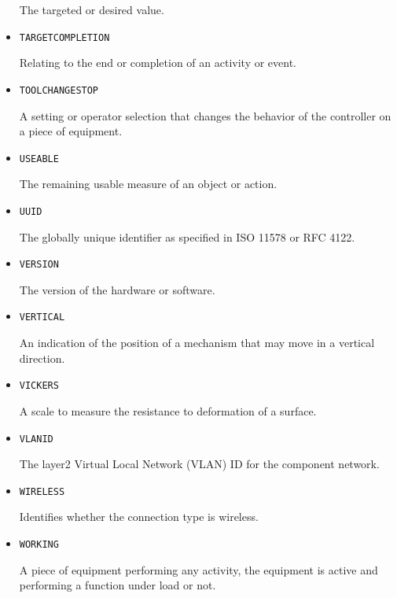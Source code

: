 \begin{itemize}
The targeted or desired value.


\item \texttt{TARGET\textunderscore COMPLETION}  

Relating to the end or completion of an activity or event.


\item \texttt{TOOL\textunderscore CHANGE\textunderscore STOP}  

A setting or operator selection that changes the behavior of the controller on a piece of equipment.


\item \texttt{USEABLE}  

The remaining usable measure of an object or action.


\item \texttt{UUID}  

The globally unique identifier as specified in ISO 11578 or RFC 4122.


\item \texttt{VERSION}  

The version of the hardware or software.



\item \texttt{VERTICAL}  

An indication of the position of a mechanism that may move in a vertical direction.


\item \texttt{VICKERS}  

A scale to measure the resistance to deformation of a surface.


\item \texttt{VLAN\textunderscore ID}  

The layer2 Virtual Local Network (VLAN) ID for the component network.


\item \texttt{WIRELESS}  

Identifies whether the connection type is wireless.


\item \texttt{WORKING}  

A piece of equipment performing any activity, the equipment is active and performing a function under load or not.

\end{itemize}


